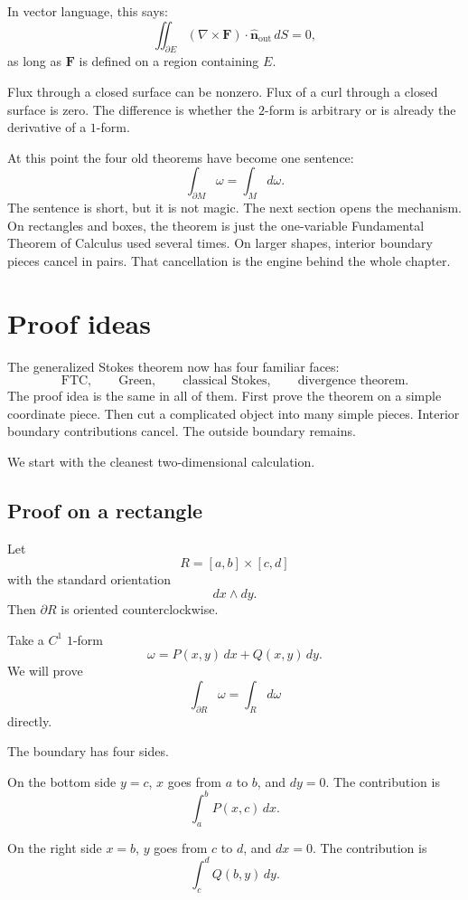 In vector language, this says:
\[
\boxed{
    \iint_{\partial E}(\nabla\times\mathbf F)\cdot\widehat{\mathbf n}_{\mathrm{out}}\,dS=0,
}
\]
as long as \(\mathbf F\) is defined on a region containing \(E\).

Flux through a closed surface can be nonzero.  Flux of a curl through a closed surface is
zero.  The difference is whether the \(2\)-form is arbitrary or is already the derivative
of a \(1\)-form.

At this point the four old theorems have become one sentence:
\[
    \int_{\partial M}\omega=\int_M d\omega.
\]
The sentence is short, but it is not magic.  The next section opens the mechanism.
On rectangles and boxes, the theorem is just the one-variable Fundamental Theorem of
Calculus used several times.  On larger shapes, interior boundary pieces cancel in
pairs.  That cancellation is the engine behind the whole chapter.

\section{Proof ideas}
\label{sec:18.7}

The generalized Stokes theorem now has four familiar faces:
\[
    \text{FTC},\qquad
    \text{Green},\qquad
    \text{classical Stokes},\qquad
    \text{divergence theorem}.
\]
The proof idea is the same in all of them.  First prove the theorem on a simple
coordinate piece.  Then cut a complicated object into many simple pieces.  Interior
boundary contributions cancel.  The outside boundary remains.

We start with the cleanest two-dimensional calculation.

\subsection{Proof on a rectangle}

Let
\[
    R=[a,b]\times[c,d]
\]
with the standard orientation
\[
    dx\wedge dy.
\]
Then \(\partial R\) is oriented counterclockwise.

Take a \(C^1\) \(1\)-form
\[
    \omega=P(x,y)\,dx+Q(x,y)\,dy.
\]
We will prove
\[
    \int_{\partial R}\omega=\int_R d\omega
\]
directly.

The boundary has four sides.

On the bottom side \(y=c\), \(x\) goes from \(a\) to \(b\), and \(dy=0\).  The
contribution is
\[
    \int_a^b P(x,c)\,dx.
\]

On the right side \(x=b\), \(y\) goes from \(c\) to \(d\), and \(dx=0\).  The contribution is
\[
    \int_c^d Q(b,y)\,dy.
\]

